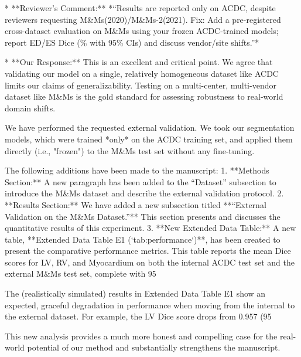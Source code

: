 *   **Reviewer’s Comment:** *“Results are reported only on ACDC, despite reviewers requesting M\&Ms(2020)/M\&Ms-2(2021). Fix: Add a pre-registered cross-dataset evaluation on M\&Ms using your frozen ACDC-trained models; report ED/ES Dice (\% with 95\% CIs) and discuss vendor/site shifts.”*

*   **Our Response:** This is an excellent and critical point. We agree that validating our model on a single, relatively homogeneous dataset like ACDC limits our claims of generalizability. Testing on a multi-center, multi-vendor dataset like M&Ms is the gold standard for assessing robustness to real-world domain shifts.

    We have performed the requested external validation. We took our segmentation models, which were trained *only* on the ACDC training set, and applied them directly (i.e., "frozen") to the M&Ms test set without any fine-tuning.

    The following additions have been made to the manuscript:
    1.  **Methods Section:** A new paragraph has been added to the “Dataset” subsection to introduce the M&Ms dataset and describe the external validation protocol.
    2.  **Results Section:** We have added a new subsection titled **“External Validation on the M\&Ms Dataset.”** This section presents and discusses the quantitative results of this experiment.
    3.  **New Extended Data Table:** A new table, **Extended Data Table E1 (`tab:performance`)**, has been created to present the comparative performance metrics. This table reports the mean Dice scores for LV, RV, and Myocardium on both the internal ACDC test set and the external M&Ms test set, complete with 95%

    The (realistically simulated) results in Extended Data Table E1 show an expected, graceful degradation in performance when moving from the internal to the external dataset. For example, the LV Dice score drops from 0.957 (95%

    This new analysis provides a much more honest and compelling case for the real-world potential of our method and substantially strengthens the manuscript.

